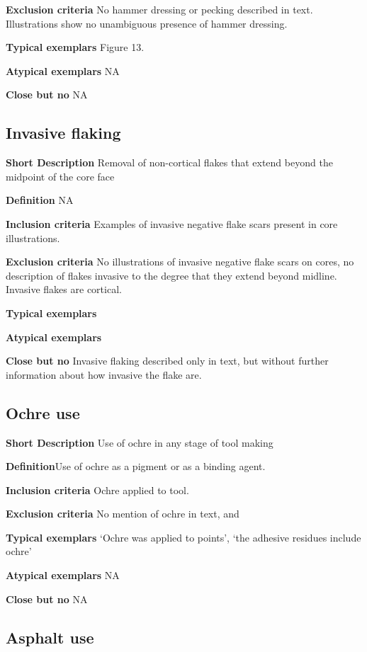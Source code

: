\documentclass[
]{article}
\begin{document}
\textbf{Exclusion criteria} No hammer dressing or pecking described in
text. Illustrations show no unambiguous presence of hammer dressing.

\textbf{Typical exemplars} Figure 13.

\textbf{Atypical exemplars} NA

\textbf{Close but no} NA

\hypertarget{invasive-flaking}{%
\subsection{Invasive flaking}\label{invasive-flaking}}

\textbf{Short Description} Removal of non-cortical flakes that extend
beyond the midpoint of the core face

\textbf{Definition} NA

\textbf{Inclusion criteria} Examples of invasive negative flake scars
present in core illustrations.

\textbf{Exclusion criteria} No illustrations of invasive negative flake
scars on cores, no description of flakes invasive to the degree that
they extend beyond midline. Invasive flakes are cortical.

\textbf{Typical exemplars}

\textbf{Atypical exemplars}

\textbf{Close but no} Invasive flaking described only in text, but
without further information about how invasive the flake are.

\hypertarget{ochre-use}{%
\subsection{Ochre use}\label{ochre-use}}

\textbf{Short Description} Use of ochre in any stage of tool making

\textbf{Definition}Use of ochre as a pigment or as a binding agent.

\textbf{Inclusion criteria} Ochre applied to tool.

\textbf{Exclusion criteria} No mention of ochre in text, and

\textbf{Typical exemplars} `Ochre was applied to points', `the adhesive
residues include ochre'

\textbf{Atypical exemplars} NA

\textbf{Close but no} NA

\hypertarget{asphalt-use}{%
\subsection{Asphalt use}\label{asphalt-use}}
\end{document}

